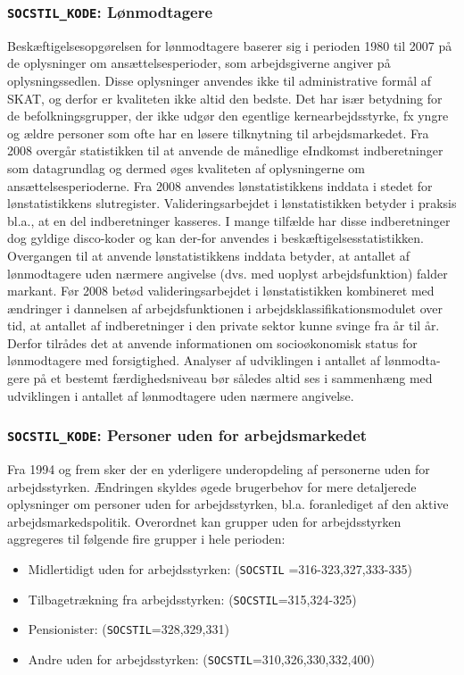 \subsubsection{\texttt{SOCSTIL\_KODE}: Lønmodtagere \label{}}

Beskæftigelsesopgørelsen for lønmodtagere baserer sig i perioden 1980 til 2007 på de oplysninger om ansættelsesperioder, som arbejdsgiverne angiver på oplysningssedlen. Disse oplysninger anvendes ikke til administrative formål af SKAT, og derfor er kvaliteten ikke altid den bedste. Det har især betydning for de befolkningsgrupper, der ikke udgør den egentlige kernearbejdsstyrke, fx yngre og ældre personer som ofte har en løsere tilknytning til arbejdsmarkedet. Fra 2008 overgår statistikken til at anvende de månedlige eIndkomst indberetninger som datagrundlag og dermed øges kvaliteten af oplysningerne om ansættelsesperioderne. Fra 2008 anvendes lønstatistikkens inddata i stedet for lønstatistikkens slutregister. Valideringsarbejdet i lønstatistikken betyder i praksis bl.a., at en del indberetninger kasseres. I mange tilfælde har disse indberetninger dog gyldige disco-koder og kan der-for anvendes i beskæftigelsesstatistikken. Overgangen til at anvende lønstatistikkens inddata betyder, at antallet af lønmodtagere uden nærmere angivelse (dvs. med uoplyst arbejdsfunktion) falder markant. Før 2008 betød valideringsarbejdet i lønstatistikken kombineret med ændringer i dannelsen af arbejdsfunktionen i arbejdsklassifikationsmodulet over tid, at antallet af indberetninger i den private sektor kunne svinge fra år til år. Derfor tilrådes det at anvende informationen om socioøkonomisk status for lønmodtagere med forsigtighed. Analyser af udviklingen i antallet af lønmodta-gere på et bestemt færdighedsniveau bør således altid ses i sammenhæng med udviklingen i antallet af lønmodtagere uden nærmere angivelse.


\subsubsection{\texttt{SOCSTIL\_KODE}: Personer uden for arbejdsmarkedet \label{}}

Fra 1994 og frem sker der en yderligere underopdeling af personerne uden for arbejdsstyrken. Ændringen skyldes øgede brugerbehov for mere detaljerede oplysninger om personer uden for arbejdsstyrken, bl.a. foranlediget af den aktive arbejdsmarkedspolitik. Overordnet kan grupper uden for arbejdsstyrken aggregeres til følgende fire grupper i hele perioden:
\begin{itemize} [topsep=6pt,itemsep=-1ex]
  \item Midlertidigt uden for arbejdsstyrken: (\texttt{SOCSTIL} =316-323,327,333-335)
  \item Tilbagetrækning fra arbejdsstyrken: (\texttt{SOCSTIL}=315,324-325)
  \item Pensionister: (\texttt{SOCSTIL}=328,329,331)
  \item Andre uden for arbejdsstyrken: (\texttt{SOCSTIL}=310,326,330,332,400)
\end{itemize}

